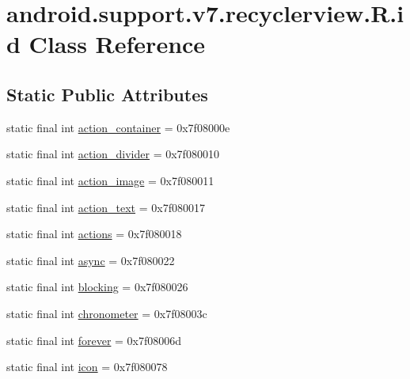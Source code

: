 \hypertarget{classandroid_1_1support_1_1v7_1_1recyclerview_1_1R_1_1id}{}\section{android.\+support.\+v7.\+recyclerview.\+R.\+id Class Reference}
\label{classandroid_1_1support_1_1v7_1_1recyclerview_1_1R_1_1id}
\subsection*{Static Public Attributes}
\begin{DoxyCompactItemize}
\item 
static final int \mbox{\hyperlink{classandroid_1_1support_1_1v7_1_1recyclerview_1_1R_1_1id_a98a2b7ea76095687895566393269cfd3}{action\+\_\+container}} = 0x7f08000e
\item 
static final int \mbox{\hyperlink{classandroid_1_1support_1_1v7_1_1recyclerview_1_1R_1_1id_a354e0bf2908e96cfc50a29d5ce3f4f72}{action\+\_\+divider}} = 0x7f080010
\item 
static final int \mbox{\hyperlink{classandroid_1_1support_1_1v7_1_1recyclerview_1_1R_1_1id_a71f35fde98329ca524926b0644e02a39}{action\+\_\+image}} = 0x7f080011
\item 
static final int \mbox{\hyperlink{classandroid_1_1support_1_1v7_1_1recyclerview_1_1R_1_1id_ac9d2ac0852b01922c9dab1db9ade8b94}{action\+\_\+text}} = 0x7f080017
\item 
static final int \mbox{\hyperlink{classandroid_1_1support_1_1v7_1_1recyclerview_1_1R_1_1id_a67f1e1a5bbb0aac475662be50905c01e}{actions}} = 0x7f080018
\item 
static final int \mbox{\hyperlink{classandroid_1_1support_1_1v7_1_1recyclerview_1_1R_1_1id_aba31688e330c70179c23baf171031cc9}{async}} = 0x7f080022
\item 
static final int \mbox{\hyperlink{classandroid_1_1support_1_1v7_1_1recyclerview_1_1R_1_1id_a696dbf3e7b2a019f9bcb9bf3e3ec2e55}{blocking}} = 0x7f080026
\item 
static final int \mbox{\hyperlink{classandroid_1_1support_1_1v7_1_1recyclerview_1_1R_1_1id_a84b100c0a11d127af280351cad812067}{chronometer}} = 0x7f08003c
\item 
static final int \mbox{\hyperlink{classandroid_1_1support_1_1v7_1_1recyclerview_1_1R_1_1id_a22c27e2ae47d30605c44c3a48b1f2fb7}{forever}} = 0x7f08006d
\item 
static final int \mbox{\hyperlink{classandroid_1_1support_1_1v7_1_1recyclerview_1_1R_1_1id_a0258f338bdda76b913eab68362944537}{icon}} = 0x7f080078

\end{DoxyCompactItemize}
